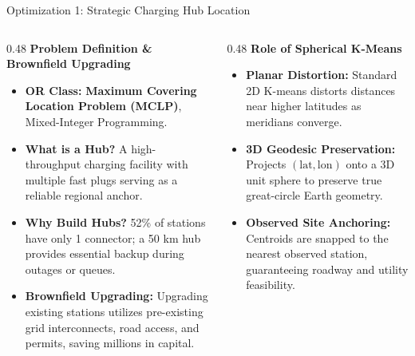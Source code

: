 \documentclass[aspectratio=169,10pt]{beamer}
\begin{document}
\begin{frame}{Optimization 1: Strategic Charging Hub Location}
  \vspace{0.15cm}
  \begin{columns}[T]
    \begin{column}{0.48\textwidth}
      \textbf{\color{Navy}Problem Definition \& Brownfield Upgrading}
      \begin{itemize}\setlength{\itemsep}{0.18cm}
        \item \textbf{OR Class:} \textbf{Maximum Covering Location Problem (MCLP)}, Mixed-Integer Programming.
        \item \textbf{What is a Hub?} A high-throughput charging facility with multiple fast plugs serving as a reliable regional anchor.
        \item \textbf{Why Build Hubs?} 52\% of stations have only 1 connector; a 50 km hub provides essential backup during outages or queues.
        \item \textbf{Brownfield Upgrading:} Upgrading existing stations utilizes pre-existing grid interconnects, road access, and permits, saving millions in capital.
      \end{itemize}
    \end{column}
    \begin{column}{0.48\textwidth}
      \textbf{\color{Teal}Role of Spherical K-Means}
      \begin{itemize}\setlength{\itemsep}{0.18cm}
        \item \textbf{Planar Distortion:} Standard 2D K-means distorts distances near higher latitudes as meridians converge.
        \item \textbf{3D Geodesic Preservation:} Projects $(\text{lat}, \text{lon})$ onto a 3D unit sphere to preserve true great-circle Earth geometry.
        \item \textbf{Observed Site Anchoring:} Centroids are snapped to the nearest observed station, guaranteeing roadway and utility feasibility.
      \end{itemize}
    \end{column}
  \end{columns}
\end{frame}
\end{document}
